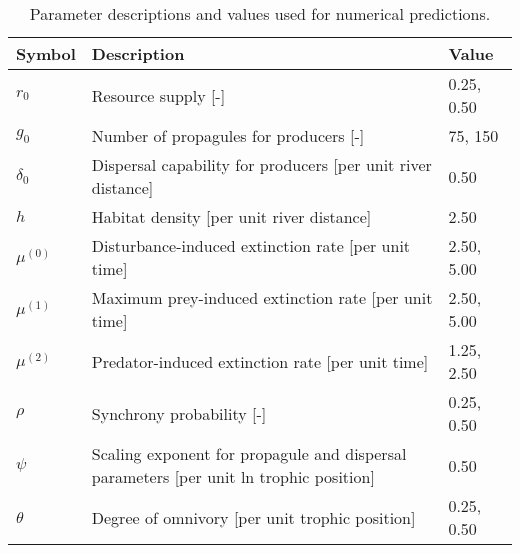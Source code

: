 \begin{table}[ht]
\centering
\caption{Parameter descriptions and values used for numerical predictions.} 
\label{tab:parms-num}
\begingroup\small
\begin{tabularx}{\textwidth}{lll}
  \hline
Symbol & Description & Value \\ 
  \hline
$r_0$ & Resource supply [-] & 0.25, 0.50 \\ 
  $g_0$ & Number of propagules for producers [-] & 75, 150 \\ 
  $\delta_0$ & Dispersal capability for producers [per unit river distance] & 0.50 \\ 
  $h$ & Habitat density [per unit river distance] & 2.50 \\ 
  $\mu^{(0)}$ & Disturbance-induced extinction rate [per unit time] & 2.50, 5.00 \\ 
  $\mu^{(1)}$ & Maximum prey-induced extinction rate [per unit time] & 2.50, 5.00 \\ 
  $\mu^{(2)}$ & Predator-induced extinction rate [per unit time] & 1.25, 2.50 \\ 
  $\rho$ & Synchrony probability [-] & 0.25, 0.50 \\ 
  $\psi$ & Scaling exponent for propagule and dispersal parameters [per unit ln trophic position] & 0.50 \\ 
  $\theta$ & Degree of omnivory [per unit trophic position] & 0.25, 0.50 \\ 
   \hline
\end{tabularx}
\endgroup
\end{table}
